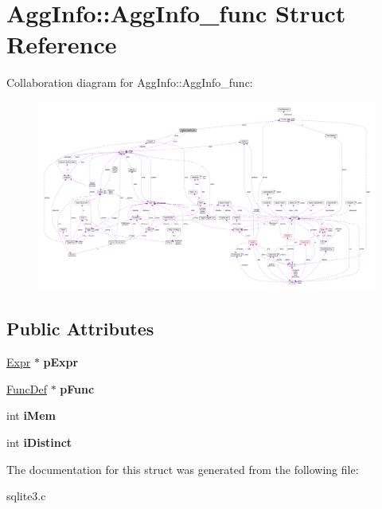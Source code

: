 \hypertarget{struct_agg_info_1_1_agg_info__func}{\section{Agg\-Info\-:\-:Agg\-Info\-\_\-func Struct Reference}
\label{struct_agg_info_1_1_agg_info__func}
}


Collaboration diagram for Agg\-Info\-:\-:Agg\-Info\-\_\-func\-:\nopagebreak
\begin{figure}[H]
\begin{center}
\leavevmode
\includegraphics[width=350pt]{struct_agg_info_1_1_agg_info__func__coll__graph}
\end{center}
\end{figure}
\subsection*{Public Attributes}
\begin{DoxyCompactItemize}
\item 
\hypertarget{struct_agg_info_1_1_agg_info__func_a7b92e1c42e60d44e28ebf695316f4018}{\hyperlink{struct_expr}{Expr} $\ast$ {\bfseries p\-Expr}}\label{struct_agg_info_1_1_agg_info__func_a7b92e1c42e60d44e28ebf695316f4018}

\item 
\hypertarget{struct_agg_info_1_1_agg_info__func_a840478e8ec53cefa57b50228f6fdafe4}{\hyperlink{struct_func_def}{Func\-Def} $\ast$ {\bfseries p\-Func}}\label{struct_agg_info_1_1_agg_info__func_a840478e8ec53cefa57b50228f6fdafe4}

\item 
\hypertarget{struct_agg_info_1_1_agg_info__func_a41a8da36555c37fffc65f1acead49a4f}{int {\bfseries i\-Mem}}\label{struct_agg_info_1_1_agg_info__func_a41a8da36555c37fffc65f1acead49a4f}

\item 
\hypertarget{struct_agg_info_1_1_agg_info__func_a4a82635b0116eb44ec8ca9e47cc509d9}{int {\bfseries i\-Distinct}}\label{struct_agg_info_1_1_agg_info__func_a4a82635b0116eb44ec8ca9e47cc509d9}

\end{DoxyCompactItemize}


The documentation for this struct was generated from the following file\-:\begin{DoxyCompactItemize}
\item 
sqlite3.\-c\end{DoxyCompactItemize}
